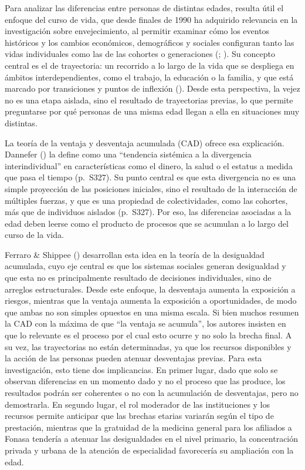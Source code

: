 \documentclass[
  spanish,
  a4paper,
  oneside]{scrbook}
\begin{document}
Para analizar las diferencias entre personas de distintas edades,
resulta útil el enfoque del curso de vida, que desde finales de 1990 ha
adquirido relevancia en la investigación sobre envejecimiento, al
permitir examinar cómo los eventos históricos y los cambios económicos,
demográficos y sociales configuran tanto las vidas individuales como las
de las cohortes o generaciones
(;
). Su concepto central es el de trayectoria: un recorrido a
lo largo de la vida que se despliega en ámbitos interdependientes, como
el trabajo, la educación o la familia, y que está marcado por
transiciones y puntos de inflexión
(). Desde esta
perspectiva, la vejez no es una etapa aislada, sino el resultado de
trayectorias previas, lo que permite preguntarse por qué personas de una
misma edad llegan a ella en situaciones muy distintas.

La teoría de la ventaja y desventaja acumulada (CAD) ofrece esa
explicación. Dannefer () la
define como una ``tendencia sistémica a la divergencia interindividual''
en características como el dinero, la salud o el estatus a medida que
pasa el tiempo (p.~S327). Su punto central es que esta divergencia no es
una simple proyección de las posiciones iniciales, sino el resultado de
la interacción de múltiples fuerzas, y que es una propiedad de
colectividades, como las cohortes, más que de individuos aislados
(p.~S327). Por eso, las diferencias asociadas a la edad deben leerse
como el producto de procesos que se acumulan a lo largo del curso de la
vida.

Ferraro \& Shippee () desarrollan
esta idea en la teoría de la desigualdad acumulada, cuyo eje central es
que los sistemas sociales generan desigualdad y que esta no es
principalmente resultado de decisiones individuales, sino de arreglos
estructurales. Desde este enfoque, la desventaja aumenta la exposición a
riesgos, mientras que la ventaja aumenta la exposición a oportunidades,
de modo que ambas no son simples opuestos en una misma escala. Si bien
muchos resumen la CAD con la máxima de que ``la ventaja se acumula'',
los autores insisten en que lo relevante es el proceso por el cual esto
ocurre y no solo la brecha final. A su vez, las trayectorias no están
determinadas, ya que los recursos disponibles y la acción de las
personas pueden atenuar desventajas previas. Para esta investigación,
esto tiene dos implicancias. En primer lugar, dado que solo se observan
diferencias en un momento dado y no el proceso que las produce, los
resultados podrán ser coherentes o no con la acumulación de desventajas,
pero no demostrarla. En segundo lugar, el rol moderador de las
instituciones y los recursos permite anticipar que las brechas etarias
variarán según el tipo de prestación, mientras que la gratuidad de la
medicina general para los afiliados a Fonasa tendería a atenuar las
desigualdades en el nivel primario, la concentración privada y urbana de
la atención de especialidad favorecería su ampliación con la edad.
\end{document}
